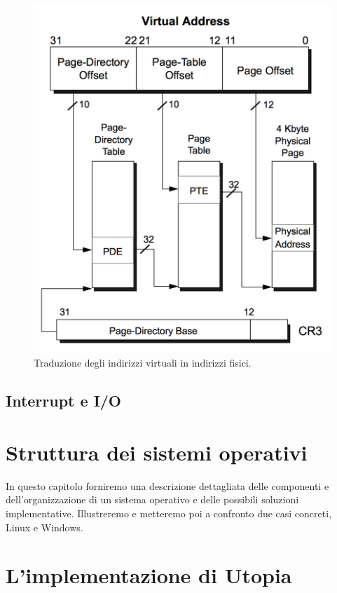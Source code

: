 \documentclass[12pt,a4paper]{report}
\begin{document}
		\begin{figure}[htbp]
		\centering
		\includegraphics[scale=0.7]{img/translation.png}
		\caption{Traduzione degli indirizzi virtuali in indirizzi fisici. \cite{AMD}\label{fig:translation}}
		\end{figure}
		
	\section {Interrupt e I/O}
				
\chapter{Struttura dei sistemi operativi}
	In questo capitolo forniremo una descrizione dettagliata delle componenti e dell'organizzazione di un sistema operativo e
	delle possibili soluzioni implementative. Illustreremo e metteremo poi a confronto due casi concreti, Linux e Windows.	

\chapter{L'implementazione di Utopia}
			
\end{document}

